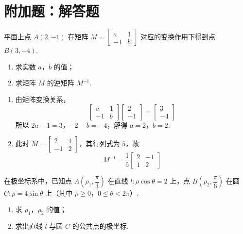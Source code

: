 \section{附加题：解答题}

\begin{problem}[A]
平面上点 \(A(2,-1)\) 在矩阵 \(M=\begin{bmatrix}a&1\\-1&b\end{bmatrix}\) 对应的变换作用下得到点 \(B(3,-4)\).

\begin{enumerate}
\item 求实数 \(a\)，\(b\) 的值；
\item 求矩阵 \(M\) 的逆矩阵 \(M^{-1}\).
\end{enumerate}
\end{problem}

\begin{solution}
\begin{enumerate}
\item 由矩阵变换关系，
\[
\begin{bmatrix}a&1\\-1&b\end{bmatrix}\begin{bmatrix}2\\-1\end{bmatrix}=\begin{bmatrix}3\\-4\end{bmatrix}
\]
所以 \(2a-1=3\)，\(-2-b=-4\)，解得 \(a=2\)，\(b=2\).
\item 此时 \(M=\begin{bmatrix}2&1\\-1&2\end{bmatrix}\)，其行列式为 \(5\)，故
\[
M^{-1}=\dfrac15\begin{bmatrix}2&-1\\1&2\end{bmatrix}
\]
\end{enumerate}
\end{solution}

\reuseproblemnumber
\begin{problem}[B]
在极坐标系中，已知点 \(A\!\left(\rho_1,\dfrac\pi3\right)\) 在直线 \(l:\rho\cos\theta=2\) 上，点 \(B\!\left(\rho_2,\dfrac\pi6\right)\) 在圆 \(C:\rho=4\sin\theta\) 上（其中 \(\rho\ge0\)，\(0\le\theta<2\pi\)）.

\begin{enumerate}
\item 求 \(\rho_1\)，\(\rho_2\) 的值；
\item 求出直线 \(l\) 与圆 \(C\) 的公共点的极坐标.
\end{enumerate}
\end{problem}

